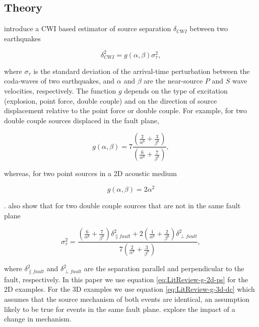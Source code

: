 \documentclass[12pt,double]{article}
\begin{document}
\vspace{2em}
\begin{centering}
\section*{Theory}
\end{centering}
\label{sec:theory}

\citet{dr_Snieder05a} introduce a CWI based estimator of source
separation $\delta_{CWI}$ between two earthquakes
\begin{linenomath*} \begin{equation}
\label{eq:Theory-dcwi_g_sigmat}
\delta_{CWI}^2 = g(\alpha,\beta)\sigma_\tau^2,
\end{equation} \end{linenomath*}
where $\sigma_\tau$ is the standard deviation of the arrival-time
perturbation between the coda-waves of two earthquakes, and $\alpha$
and $\beta$ are the near-source $P$ and $S$ wave velocities,
respectively. The function $g$ depends on the type of excitation
(explosion, point force, double couple) and on the direction of
source displacement relative to the point force or double couple.
For example, for two double couple sources displaced in the fault
plane,
\begin{linenomath*} \begin{equation}
\label{eq:LitReview-g-3d-dc}
g(\alpha,\beta) = 7
\frac{\left(\frac{2}{\alpha^6}+\frac{3}{\beta^6}\right)}{\left(\frac{6}{\alpha^8}+\frac{7}{\beta^8}\right)},
\end{equation} \end{linenomath*}
whereas, for two point sources in a 2D acoustic medium
\begin{linenomath*} \begin{equation}
\label{eq:LitReview-g-2d-ps} g(\alpha,\beta) = 2 \alpha^2
\end{equation} \end{linenomath*}
\citep{dr_Snieder05a}. \citet{dr_Snieder05a} also show that for two 
double couple sources that are not in the same fault plane
\begin{linenomath*} \begin{equation}
\label{eq:LitReview-fulDC-sep}
\sigma_\tau^2 = 
\frac{ \left(\frac{6}{\alpha^8}+\frac{7}{\beta^8} \right) \delta_{\| fault}^2 + 
2 \left(\frac{1}{\alpha^8}+\frac{2}{\beta^8} \right) \delta_{\perp fault}^2 }
{7 \left(\frac{2}{\alpha^8}+\frac{3}{\beta^8} \right)},
\end{equation} \end{linenomath*}
where $\delta_{\| fault}^2$ and $\delta_{\perp fault}^2$ are the separation parallel 
and perpendicular to the fault, respectively. In this paper we use 
equation \ref{eq:LitReview-g-2d-ps} for the 2D examples.
For the 3D examples we use equation
\ref{eq:LitReview-g-3d-dc} which assumes that the source mechanism
of both events are identical, an assumption likely to be true for
events in the same fault plane. \cite{dr_Robinson07c} explore the
impact of a change in mechanism.
\end{document}
